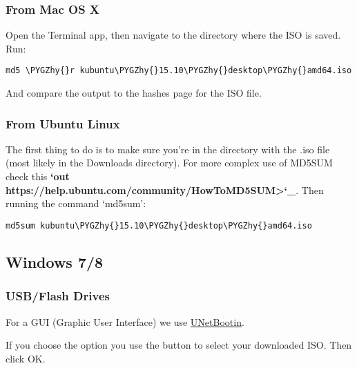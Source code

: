 \documentclass[letterpaper,10pt,english]{sphinxmanual}
\def\PYGZhy{\char`\-}
\begin{document}
\subsubsection{From Mac OS X}
\label{docs/installation:from-mac-os-x}
Open the Terminal app, then navigate to the directory where the ISO is saved.
Run:

\begin{Verbatim}[commandchars=\\\{\}]
md5 \PYGZhy{}r kubuntu\PYGZhy{}15.10\PYGZhy{}desktop\PYGZhy{}amd64.iso
\end{Verbatim}

And compare the output to the hashes page for the ISO file.


\subsubsection{From Ubuntu Linux}
\label{docs/installation:from-ubuntu-linux}
The first thing to do is to make sure you're in the directory with the .iso file (most likely in the Downloads directory). For more complex use of MD5SUM check this {\color{red}\bfseries{}{}`out https://help.ubuntu.com/community/HowToMD5SUM\textgreater{}{}`\_}. Then running the command `md5sum':

\begin{Verbatim}[commandchars=\\\{\}]
md5sum kubuntu\PYGZhy{}15.10\PYGZhy{}desktop\PYGZhy{}amd64.iso
\end{Verbatim}


\subsection{Windows 7/8}
\label{docs/installation:windows-7-8}

\subsubsection{USB/Flash Drives}
\label{docs/installation:usb-drives-link}\label{docs/installation:usb-flash-drives}
For a GUI (Graphic User Interface) we use \href{http://unetbootin\_link/}{UNetBootin}.

If you choose the  option you use the  button to select your downloaded ISO. Then click OK.

\end{document}
